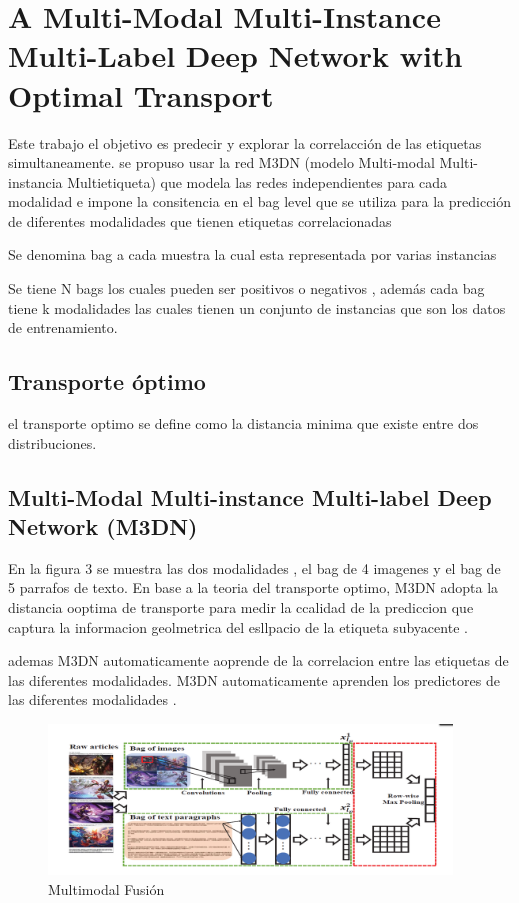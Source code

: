 \documentclass[conference]{IEEEtran}
\begin{document}
\section{A Multi-Modal Multi-Instance
Multi-Label Deep Network with Optimal Transport}



Este trabajo el objetivo es predecir y explorar la correlacción de las etiquetas  simultaneamente. se propuso usar la red M3DN (modelo Multi-modal Multi-instancia Multietiqueta) que modela las redes independientes para cada modalidad e impone la  consitencia en el bag level que se utiliza para la predicción de diferentes modalidades que tienen etiquetas correlacionadas

Se denomina bag a cada muestra la cual esta representada por varias instancias  

Se tiene N bags los cuales pueden ser positivos o negativos , además cada bag tiene k modalidades las cuales tienen un conjunto de instancias que son los datos de entrenamiento.


\subsection{Transporte óptimo} 
el transporte optimo se define como la distancia minima que existe entre dos distribuciones.

\subsection{Multi-Modal Multi-instance Multi-label Deep Network (M3DN)}
En la figura 3 se muestra las dos modalidades , el bag de 4 imagenes y el bag de 5 parrafos de texto.
En base a la teoria del transporte optimo, M3DN adopta la distancia ooptima de transporte para medir la ccalidad de la prediccion que captura la informacion geolmetrica del esllpacio de la etiqueta subyacente  .

ademas M3DN automaticamente aoprende de la correlacion entre las etiquetas de las diferentes modalidades. M3DN automaticamente aprenden los predictores de las diferentes modalidades .

\begin{figure}
  \includegraphics[width=\textwidth,height=4cm]{figura2.png}
  \caption{Multimodal Fusión}
  \label{fig}
\end{figure}
\end{document}
